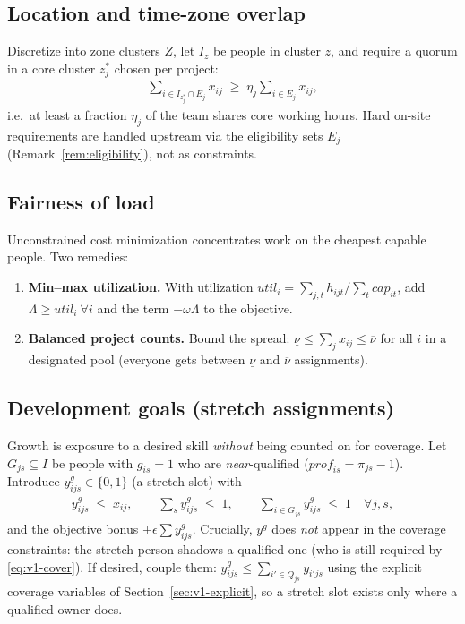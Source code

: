 \documentclass[11pt]{article}
\newcommand{\B}{\{0,1\}}
\theoremstyle{remark}
\begin{document}
\subsection{Location and time-zone overlap}
Discretize into zone clusters $Z$, let $I_z$ be people in cluster $z$, and
require a quorum in a core cluster $z^{*}_j$ chosen per project:
\begin{align}
\sum_{i \in I_{z^{*}_j} \cap E_j} x_{ij}
  \;\ge\; \eta_j \sum_{i \in E_j} x_{ij},
\end{align}
i.e.\ at least a fraction $\eta_j$ of the team shares core working hours.
Hard on-site requirements are handled upstream via the eligibility sets
$E_j$ (Remark~\ref{rem:eligibility}), not as constraints.

\subsection{Fairness of load}
Unconstrained cost minimization concentrates work on the cheapest capable
people. Two remedies:
\begin{enumerate}[label=(\alph*)]
\item \textbf{Min--max utilization.} With utilization
  $\mathit{util}_i = \sum_{j,t} h_{ijt} \big/ \sum_t \mathit{cap}_{it}$,
  add $\Lambda \ge \mathit{util}_i \ \forall i$ and the term
  $-\omega \Lambda$ to the objective.
\item \textbf{Balanced project counts.} Bound the spread:
  $\underline{\nu} \le \sum_j x_{ij} \le \overline{\nu}$ for all $i$ in a
  designated pool (everyone gets between $\underline{\nu}$ and
  $\overline{\nu}$ assignments).
\end{enumerate}

\subsection{Development goals (stretch assignments)}
Growth is exposure to a desired skill \emph{without} being counted on for
coverage. Let $G_{js} \subseteq I$ be people with $g_{is} = 1$ who are
\emph{near}-qualified ($\mathit{prof}_{is} = \pi_{js} - 1$). Introduce
$y^{g}_{ijs} \in \B$ (a stretch slot) with
\begin{align}
y^{g}_{ijs} \;\le\; x_{ij}, \qquad
\sum_{s} y^{g}_{ijs} \;\le\; 1, \qquad
\sum_{i \in G_{js}} y^{g}_{ijs} \;\le\; 1
  \quad \forall j, s,
\end{align}
and the objective bonus $+\epsilon \sum y^{g}_{ijs}$. Crucially,
$y^{g}$ does \emph{not} appear in the coverage constraints: the stretch
person shadows a qualified one (who is still required by
\eqref{eq:v1-cover}). If desired, couple them:
$y^{g}_{ijs} \le \sum_{i' \in Q_{js}} y_{i'js}$ using the explicit coverage
variables of Section~\ref{sec:v1-explicit}, so a stretch slot exists only
where a qualified owner does.
\end{document}
